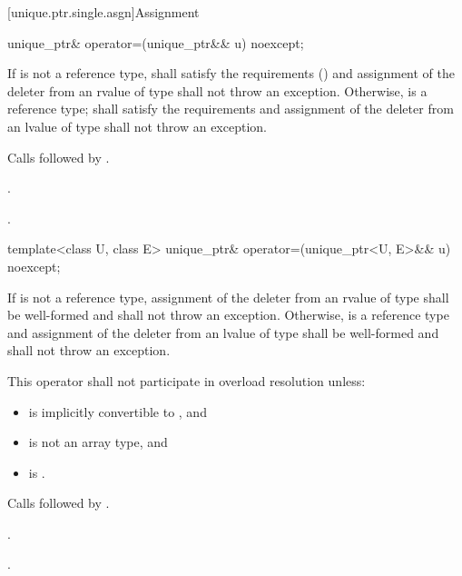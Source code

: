 [unique.ptr.single.asgn]{Assignment}

%
\begin{itemdecl}
unique_ptr& operator=(unique_ptr&& u) noexcept;
\end{itemdecl}

\begin{itemdescr}
\pnum
\requires If  is not a reference type,  shall satisfy the
 requirements () and assignment
of the deleter from an rvalue of type  shall not throw an exception.
Otherwise,  is a reference type;
 shall satisfy the 
requirements and assignment of the deleter from an
lvalue of type  shall not throw an exception.

\pnum
\effects Calls  followed by
.

\pnum
\returns {}.

\pnum
\ensures {}.
\end{itemdescr}

%
\begin{itemdecl}
template<class U, class E> unique_ptr& operator=(unique_ptr<U, E>&& u) noexcept;
\end{itemdecl}

\begin{itemdescr}
\pnum
\requires If  is not a reference type, assignment of the deleter from
an rvalue of type  shall be well-formed and shall not throw an exception.
Otherwise,  is a reference type and assignment of the deleter from an lvalue
of type  shall be well-formed and shall not throw an exception.

\pnum
\remarks This operator shall not participate in overload resolution unless:

\begin{itemize}
\item {} is implicitly convertible to , and
\item {} is not an array type, and
\item {} is .
\end{itemize}

\pnum
\effects Calls  followed by
.

\pnum
\returns {}.

\pnum
\ensures {}.
\end{itemdescr}

